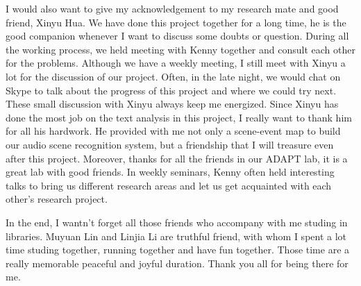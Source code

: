\begin{thanks}
I would also want to give my acknowledgement to my research mate and good friend, Xinyu Hua. 
We have done this project together for a long time, he is the good companion whenever I want to discuss some doubts or question. 
During all the working process, we held meeting with Kenny together and consult each other for the problems. 
Although we have a weekly meeting, I still meet with Xinyu a lot for the discussion of our project. 
Often, in the late night, we would chat on Skype to talk about the progress of this project and where we could try next. 
These small discussion with Xinyu always keep me energized. 
Since Xinyu has done the most job on the text analysis in this project, I really want to thank him for all his hardwork. 
He provided with me not only a scene-event map to build our audio scene recognition system, but a friendship that I will treasure even after this project. 
Moreover, thanks for all the friends in our ADAPT lab, it is a great lab with good friends. 
In weekly seminars, Kenny often held interesting talks to bring us different research areas and let us get acquainted with each other's research project.    

In the end, I wantn't forget all those friends who accompany with me studing in libraries. 
Muyuan Lin and Linjia Li are truthful friend, with whom I spent a lot time studing together, running together and have fun together. 
Those time are a really memorable peaceful and joyful duration. Thank you all for being there for me. 

\end{thanks}

